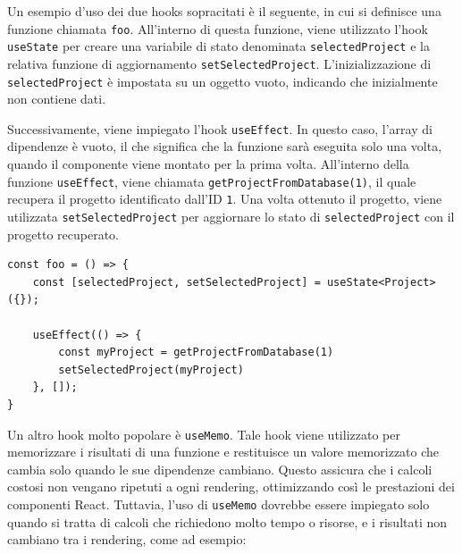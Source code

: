 \documentclass[target=bach,aauheader=,style=]{thud}
\begin{document}
\noindent Un esempio d'uso dei due hooks sopracitati è il seguente, in cui si definisce una funzione chiamata \texttt{foo}. All'interno di questa funzione, viene utilizzato l'hook \texttt{useState} per creare una variabile di stato denominata \texttt{selectedProject} e la relativa funzione di aggiornamento \texttt{setSelectedProject}. L'inizializzazione di \texttt{selectedProject} è impostata su un oggetto vuoto, indicando che inizialmente non contiene dati.

\noindent Successivamente, viene impiegato l'hook \texttt{useEffect}. In questo caso, l'array di dipendenze è vuoto, il che significa che la funzione sarà eseguita solo una volta, quando il componente viene montato per la prima volta. All'interno della funzione \texttt{useEffect}, viene chiamata \texttt{getProjectFromDatabase(1)}, il quale recupera il progetto identificato dall'ID \texttt{1}. Una volta ottenuto il progetto, viene utilizzata \texttt{setSelectedProject} per aggiornare lo stato di \texttt{selectedProject} con il progetto recuperato.

\begin{lstlisting}[caption=\texttt{useEffect} e \texttt{useState} per ottenere e salvare un progetto in uno stato locale]
const foo = () => {
    const [selectedProject, setSelectedProject] = useState<Project>({});

    useEffect(() => {
        const myProject = getProjectFromDatabase(1)
        setSelectedProject(myProject)
    }, []);
}
\end{lstlisting}

\noindent Un altro hook molto popolare è \texttt{useMemo}. Tale hook viene utilizzato per memorizzare i risultati di una funzione e restituisce un valore memorizzato che cambia solo quando le sue dipendenze cambiano. Questo assicura che i calcoli costosi non vengano ripetuti a ogni rendering, ottimizzando così le prestazioni dei componenti React. Tuttavia, l'uso di \texttt{useMemo} dovrebbe essere impiegato solo quando si tratta di calcoli che richiedono molto tempo o risorse, e i risultati non cambiano tra i rendering, come ad esempio:
\end{document}
